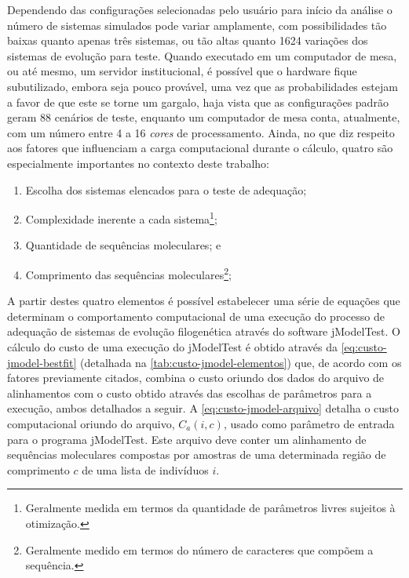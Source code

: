 \documentclass[english,brazilian]{UNISINOSmonografia} %
\begin{document}
Dependendo das configurações selecionadas pelo usuário para início da análise o número de sistemas simulados pode variar amplamente, com possibilidades tão baixas quanto apenas três sistemas, ou tão altas quanto 1624 variações dos sistemas de evolução para teste.
Quando executado em um computador de mesa, ou até mesmo, um servidor institucional, é possível que o hardware fique subutilizado, embora seja pouco provável, uma vez que as probabilidades estejam a favor de que este se torne um gargalo, haja vista que as configurações padrão geram 88 cenários de teste, enquanto um computador de mesa conta, atualmente, com um número entre 4 a 16 \textit{cores} de processamento.
Ainda, no que diz respeito aos fatores que influenciam a carga computacional durante o cálculo, quatro são especialmente importantes no contexto deste trabalho:


\begin{enumerate}[label={\arabic*)}]
	\label{list:fatores-influenciam-performance}
	
	\item Escolha dos sistemas elencados para o teste de adequação;
	
	\item Complexidade inerente a cada sistema\footnote{
		Geralmente medida em termos da quantidade de parâmetros livres sujeitos à otimização.
	};
	
	\item Quantidade de sequências moleculares; e
	
	\item Comprimento das sequências moleculares\footnote{
		Geralmente medido em termos do número de caracteres que compõem a sequência.
	};
\end{enumerate}


A partir destes quatro elementos é possível estabelecer uma série de equações que determinam o comportamento computacional de uma execução do processo de adequação de sistemas de evolução filogenética através do software jModelTest.
O cálculo do custo de uma execução do jModelTest é obtido através da \autoref{eq:custo-jmodel-bestfit} (detalhada na \autoref{tab:custo-jmodel-elementos}) que, de acordo com os fatores previamente citados, combina o custo oriundo dos dados do arquivo de alinhamentos com o custo obtido através das escolhas de parâmetros para a execução, ambos detalhados a seguir.
A \autoref{eq:custo-jmodel-arquivo} detalha o custo computacional oriundo do arquivo, $ C_a(i,c) $, usado como parâmetro de entrada para o programa jModelTest. 
Este arquivo deve conter um alinhamento de sequências moleculares compostas por amostras de uma determinada região de comprimento $ c $ de uma lista de indivíduos $ i $.
\end{document}

